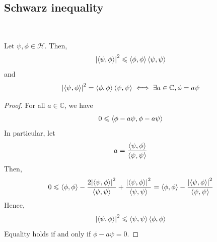 \documentclass[a4paper,11pt]{article}
\begin{document}
\subsection{Schwarz inequality}\ \vspace*{-1.5em}
\begin{theorem}
	Let \( \psi, \phi \in \mathcal H \).
	Then,
	\[
		\abs{\left\langle{\psi, \phi}\right\rangle}^2 \leqslant \left\langle{\phi, \phi}\right\rangle \left\langle{\psi, \psi}\right\rangle
	\]
	and
	\[
		\abs{\left\langle{\psi, \phi}\right\rangle}^2 = \left\langle{\phi, \phi}\right\rangle \left\langle{\psi, \psi}\right\rangle \iff \exists a \in \mathbb C, \phi = a \psi
	\]
\end{theorem}
\begin{proof}
	For all \( a \in \mathbb C \), we have
	\[
		0 \leqslant \left\langle{\phi - a \psi, \phi - a \psi}\right\rangle
	\]
	In particular, let
	\[
		a = \frac{\left\langle{\psi, \phi}\right\rangle}{\left\langle{\psi, \psi}\right\rangle}
	\]
	Then,
	\[
		0 \leqslant \left\langle{\phi, \phi}\right\rangle - \frac{2 \abs{\left\langle{\psi, \phi}\right\rangle}^2}{\left\langle{\psi, \psi}\right\rangle} + \frac{\abs{\left\langle{\psi, \phi}\right\rangle}^2}{\left\langle{\psi, \psi}\right\rangle} = \left\langle{\phi, \phi}\right\rangle - \frac{\abs{\left\langle{\psi, \phi}\right\rangle}^2}{\left\langle{\psi, \psi}\right\rangle}
	\]
	Hence,
	\[
		\abs{\left\langle{\psi, \phi}\right\rangle}^2 \leqslant \left\langle{\psi, \psi}\right\rangle \left\langle{\phi, \phi}\right\rangle
	\]
	Equality holds if and only if \( \phi - a \psi = 0 \).
\end{proof}
\end{document}
